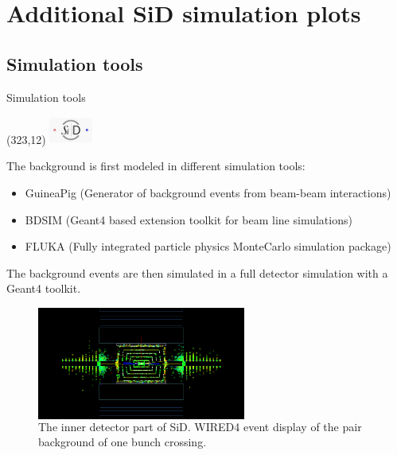 \documentclass[xcolor={dvipsnames}]{beamer}
\newcommand{\sidlogo}{
  \setlength{\TPHorizModule}{1pt}
  \setlength{\TPVertModule}{1pt}
  \begin{textblock}{1}(323,12)
   \includegraphics[width=40pt,height=26pt]{figures/SiD.jpeg}
  \end{textblock}
  }
\begin{document}
\section{Additional SiD simulation plots}
\subsection{Simulation tools}
\begin{frame}{Simulation tools}
\sidlogo
The background is first modeled in different simulation tools:\\
\begin{itemize}
\item \alert{GuineaPig} (Generator of background events from beam-beam interactions)
\item \alert{BDSIM} (Geant4 based extension toolkit for beam line simulations)
\item \alert{FLUKA} (Fully integrated particle physics MonteCarlo simulation package)
\end{itemize}
\vspace*{0.5cm}
The background events are then simulated in a \alert{full detector simulation} with a Geant4 toolkit.\\
\vspace*{0.2cm}
\begin{figure}
	\begin{columns}
         \flushright
        \includegraphics[width=0.61\textwidth]{figures/Full_bunchcrossing_rhoz.png}
        \caption{\small The inner detector part of SiD. WIRED4 event display of the pair background of one bunch crossing.}
      \end{columns}
\end{figure}
\end{frame}
\end{document}
